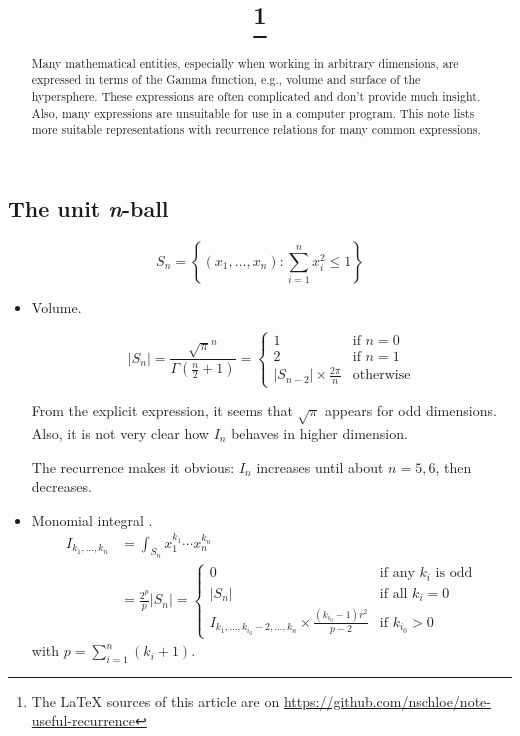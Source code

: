 \documentclass[draft]{scrartcl}
\title{\mytitle\footnote{The LaTeX sources of this article are on \url{https://github.com/nschloe/note-useful-recurrence}}}
\author{\myauthor}
\begin{document}
\maketitle
\begin{abstract}
  Many mathematical entities, especially when working in arbitrary dimensions, are
  expressed in terms of the Gamma function, e.g., volume and surface of the hypersphere.
  These expressions are often complicated and don't provide much insight. Also, many
  expressions are unsuitable for use in a computer program. This note lists more
  suitable representations with recurrence relations for many common expressions.
\end{abstract}


\subsection*{The unit \textit{n}-ball}
\[
  S_n = \left\{(x_1,\dots,x_n): \sum_{i=1}^n x_i^2 \le 1\right\}
\]

\begin{itemize}
  \item Volume.

\begin{equation*}\label{ndimball}
  |S_n|
  = \frac{\sqrt{\pi}^n}{\Gamma(\frac{n}{2}+1)}
  = \begin{cases}
     1&\text{if $n = 0$}\\
     2&\text{if $n = 1$}\\
     |S_{n-2}| \times \frac{2\pi}{n}&\text{otherwise}
  \end{cases}
\end{equation*}

From the explicit expression, it seems that $\sqrt{\pi}$ appears for odd dimensions.
Also, it is not very clear how $I_n$ behaves in higher dimension.

The recurrence makes it obvious: $I_n$ increases until about $n=5,6$, then decreases.

\item Monomial integral \cite{folland}.
\[
  \begin{split}
    I_{k_1,\dots,k_n}
    &= \int_{S_n} x_1^{k_1}\cdots x_n^{k_n}\\
    &= \frac{2^p}{p} |S_n|
    =\begin{cases}
      0&\text{if any $k_i$ is odd}\\
      |S_n|&\text{if all $k_i=0$}\\
      I_{k_1,\dots,k_{i_0}-2,\dots,k_n} \times \frac{(k_{i_0} - 1) r^2}{p - 2}&\text{if $k_{i_0} > 0$}
    \end{cases}
  \end{split}
\]
with $p=\sum_{i=1}^n (k_i+1)$.
\end{itemize}
\end{document}
